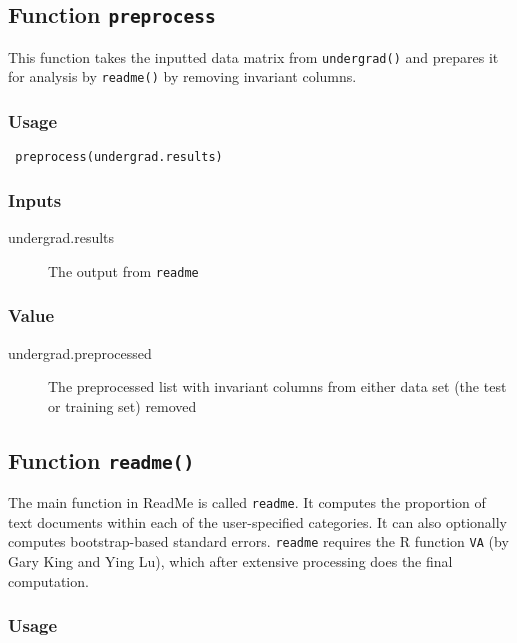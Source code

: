 \documentclass[oneside,letterpaper,titlepage]{article}
\begin{document}
\subsection{Function \texttt{preprocess}}
This function takes the inputted data matrix from \texttt{undergrad()}
and prepares it for analysis by \texttt{readme()} by removing
invariant columns.   

\subsubsection{Usage}


\begin{verbatim}
 preprocess(undergrad.results)
\end{verbatim}

\subsubsection{Inputs}

\begin{description}
\item[undergrad.results] The output from \texttt{readme} 
\end{description}

\subsubsection{Value}

\begin{description}
\item[undergrad.preprocessed] The preprocessed list with invariant
columns from either data set (the test or training set) removed 
\end{description}

\subsection{Function \texttt{readme()}}
The main function in ReadMe is called \texttt{readme}.  It computes
the proportion of text documents within each of the user-specified
categories.  It can also optionally computes bootstrap-based standard
errors.  \texttt{readme} requires the R function \texttt{VA} (by
Gary King and Ying Lu), which after extensive processing does the
final computation.

\subsubsection{Usage}
\end{document}
